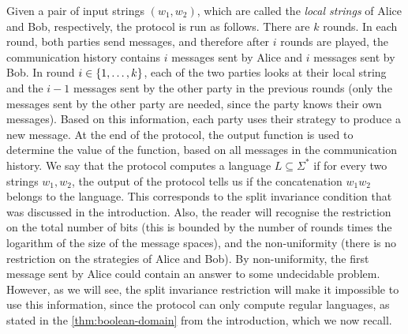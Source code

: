 Given a pair of input strings $(w_1,w_2)$, which are called the \emph{local
strings} of Alice and Bob, respectively, the  protocol is run as follows. There
are $k$ rounds. In each round, both parties send messages, and therefore after
$i$ rounds are played, the communication history contains $i$ messages sent by
Alice and $i$ messages sent by Bob.  In round  $i \in \{1,\ldots,k\}$,  each
of the two parties  looks at their local string and the $i-1$ messages sent by
the other party in the previous rounds (only the messages sent by the other
party are needed, since the party knows their own messages). Based on this
information, each party uses their strategy to produce a new message. At the
end of the protocol, the output function is used to determine the value of the
function, based on all messages in  the communication history. We say that the
protocol computes a language $L \subseteq \Sigma^*$ if for every two strings
$w_1,w_2$, the output of the protocol tells us if the concatenation $w_1w_2$
belongs to the language. This corresponds to the split invariance condition
that was discussed in the introduction.  Also, the reader will recognise the
restriction on the total number of bits (this is bounded by the number of
rounds times the logarithm of the size of the message spaces), and the
non-uniformity (there is no restriction on the strategies of Alice and Bob). By
non-uniformity, the first message sent by Alice could contain an answer to some
undecidable problem. However, as we will see, the split invariance restriction
will make it impossible to use this information, since the protocol can only
compute regular languages, as stated in the \cref{thm:boolean-domain} from the
introduction, which we now recall.


\booleandomain*


